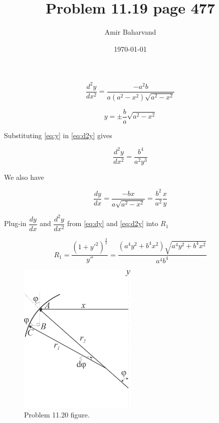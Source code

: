 \documentclass{article}
\title{Problem 11.19 page 477}
\author{Amir Baharvand }
\date{\today}
\begin{document}
\maketitle

\begin{equation}
	\frac{d^2y}{dx^2} = \frac{-a^2 b}{a(a^2 - x^2) \sqrt{a^2 - x^2}}
	\label{eq:d2y}
\end{equation}

\begin{equation}
	y = \pm \frac{b}{a}\sqrt{a^2 - x^2}
	\label{eq:y}
\end{equation}

Substituting \ref{eq:y} in \ref{eq:d2y} gives

\begin{equation}
	\frac{d^2y}{dx^2} = \frac{b^4}{a^2 y^3}
	\label{eq:d2y_2}
\end{equation}

We also have 

\begin{equation}
	\frac{dy}{dx} = \frac{-bx}{a \sqrt{a^2 - x^2}} = \frac{b^2}{a^2} \frac{x}{y}
	\label{eq:dy}
\end{equation}

Plug-in $\dfrac{dy}{dx}$ and $\dfrac{d^2y}{dx^2}$ from \ref{eq:dy} and \ref{eq:d2y} into $R_1$ 

\begin{equation}
	R_1 = \frac{(1 + y'^2)^\frac{3}{2}}{y''} = \frac{(a^4 y^2 + b^4 x^2) \sqrt{a^4 y^2 + b^4 x^2}}{a^4 b^4}
	\label{eq:R1}
\end{equation}

\begin{figure}
	\centering
	\includegraphics[width=0.5\textwidth]{fig11_19.jpg}
	\caption{Problem 11.20 figure.}
	\label{fig:p11_2}
\end{figure}
\end{document}
